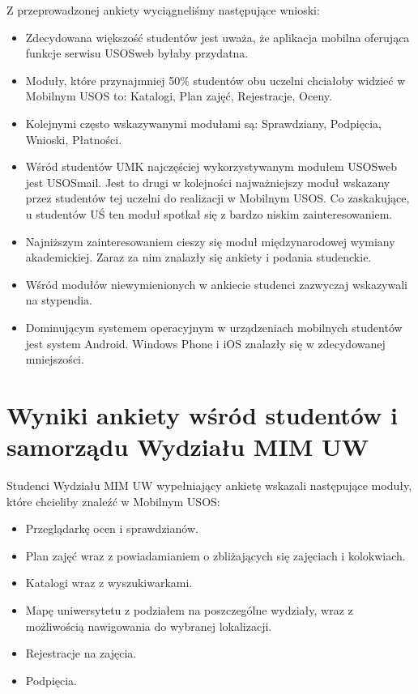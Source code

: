 \documentclass{pracamgr}
\begin{document}
Z przeprowadzonej ankiety wyciągneliśmy następujące wnioski:
\begin{itemize}
	\item Zdecydowana większość studentów jest uważa, że aplikacja mobilna oferująca funkcje serwisu USOSweb byłaby przydatna.
	\item Moduły, które przynajmniej 50\% studentów obu uczelni chciałoby widzieć w Mobilnym USOS to: Katalogi, Plan zajęć, Rejestracje, Oceny.
	\item Kolejnymi często wskazywanymi modułami są: Sprawdziany, Podpięcia, Wnioski, Płatności.
	\item Wśród studentów UMK najczęściej wykorzystywanym modułem USOSweb jest USOSmail. Jest to drugi w kolejności najważniejszy moduł wskazany przez studentów tej uczelni do realizacji w Mobilnym USOS. Co zaskakujące, u studentów UŚ ten moduł spotkał się z bardzo niskim zainteresowaniem.
	\item Najniższym zainteresowaniem cieszy się moduł międzynarodowej wymiany akademickiej. Zaraz za nim znalazły się ankiety i podania studenckie.
	\item Wśród modułów niewymienionych w ankiecie studenci zazwyczaj wskazywali na stypendia.
	\item Dominującym systemem operacyjnym w urządzeniach mobilnych studentów jest system Android. Windows Phone i iOS znalazły się w zdecydowanej mniejszości.
\end{itemize}

\section{Wyniki ankiety wśród studentów i samorządu Wydziału MIM UW}

Studenci Wydziału MIM UW wypełniający ankietę wskazali następujące moduły, które
chcieliby znaleźć w Mobilnym USOS:

\begin{itemize}
	\item Przeglądarkę ocen i sprawdzianów.
	\item Plan zajęć wraz z powiadamianiem o zbliżających się zajęciach
	      i kolokwiach.
	\item Katalogi wraz z wyszukiwarkami.
	\item Mapę uniwersytetu z podziałem na poszczególne wydziały, wraz z
	      możliwością nawigowania do wybranej lokalizacji.
	\item Rejestracje na zajęcia.
	\item Podpięcia.
\end{itemize}
\end{document}
